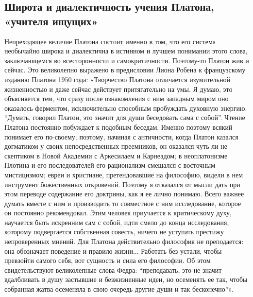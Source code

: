 \subsection{Широта и диалектичность учения Платона, «учителя ищущих»}

Непреходящее величие  Платона состоит  именно в  том, что  его система
необычайно  широка  и  диалектична   в  истинном  и  лучшем  понимании
этого  слова,  заключающемся   во  всесторонности  и  самокритичности.
Поэтому-то Платон жив и сейчас. Это великолепно выражено в предисловии
Лиона  Робена к  французскому изданию  Платона 1950  года: «Творчество
Платона отличается  изумительной жизненностью и даже  сейчас действует
притягательно  на  умы.  Я  думаю,  это  объясняется  тем,  что  сразу
после  ознакомления  с ним  западным  миром  оно оказалось  ферментом,
исключительно способным пробуждать духовную энергию. ``Думать, говорил
Платон, это значит для души  беседовать сама с собой''. Чтение Платона
постоянно побуждает к подобным беседам. Именно поэтому всякий понимает
его  по-своему; поэтому,  начиная с  античности, когда  Платон казался
догматиком у своих непосредственных преемников, он оказался чуть ли не
скептиком в Новой  Академии с Аркесилаем и  Карнеадом; в неоплатонизме
Плотина  и его  последователей  его рационализм  смешался с  восточным
мистицизмом; евреи и христиане,  претендовавшие на философию, видели в
нем инструмент  божественных откровений. Поэтому я  отказался от мысли
дать  при  этом переводе  содержание  его  доктрины,  как я  ее  лично
понимаю. Всего важнее думать вместе  с ним и производить то совместное
с ним  исследование, которое  он постоянно рекомендовал.  Этим человек
приучается к критическому духу, научается  быть искренним сам с собой,
идти смело  до конца  исследования, которому  подвергается собственная
совесть, ничего не уступать престижу непроверенных мнений. Для Платона
действительно  философия не  преподается: она  обозначает поведение  и
правило жизни... Работать без устали, чтобы превзойти самого себя, вот
сущность и  сила его  философии. Об этом  свидетельствуют великолепные
слова Федра: ``преподавать, это не значит вдалбливать в душу застывшие
и  безжизненные  идеи, но  осеменять  ее  так, чтобы  собранная  жатва
осеменяла в свою очередь другие души и так бесконечно''».

